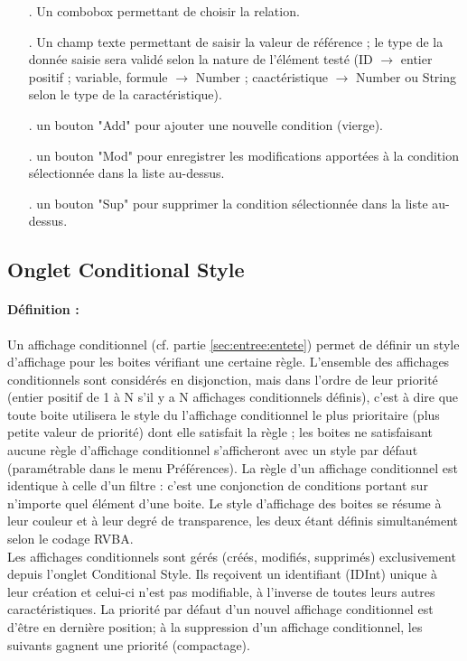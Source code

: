 \documentclass[a4paper]{article}
\begin{document}
\begin{itemize}
\begin{itemize}
  \item[.] Un combobox permettant de choisir la relation.
  \item[.] Un champ texte permettant de saisir la valeur de référence ; le type de la donnée saisie sera validé selon la nature de l'élément testé (ID $\to$ entier positif ; variable, formule $\to$ Number ; caactéristique $\to$ Number ou String selon le type de la caractéristique).
  \item[.] un bouton "Add" pour ajouter une nouvelle condition (vierge).\danger
  \item[.] un bouton "Mod" pour enregistrer les modifications apportées à la condition sélectionnée dans la liste au-dessus.\danger
  \item[.] un bouton "Sup" pour supprimer la condition sélectionnée dans la liste au-dessus.\danger
  \end{itemize}
\end{itemize}


\subsection{Onglet Conditional Style}\label{sec:onglet:aff}

\paragraph{Définition :} Un affichage conditionnel (cf. partie \ref{sec:entree:entete}) permet de définir un style d'affichage pour les boites vérifiant une certaine règle. L'ensemble des affichages conditionnels sont considérés en disjonction, mais dans l'ordre de leur priorité (entier positif de 1 à N s'il y a N affichages conditionnels définis), c'est à dire que toute boite utilisera le style du l'affichage conditionnel le plus prioritaire (plus petite valeur de priorité) dont elle satisfait la règle ; les boites ne satisfaisant aucune règle d'affichage conditionnel s'afficheront avec un style par défaut (paramétrable dans le menu Préférences). La règle d'un affichage conditionnel est identique à celle d'un filtre : c'est une conjonction de conditions portant sur n'importe quel élément d'une boite. Le style d'affichage des boites se résume à leur couleur et à leur degré de transparence, les deux étant définis simultanément selon le codage RVBA.\\Les affichages conditionnels sont gérés (créés, modifiés, supprimés) exclusivement depuis l'onglet Conditional Style. Ils reçoivent un identifiant (IDInt) unique à leur création et celui-ci n'est pas modifiable, à l'inverse de toutes leurs autres caractéristiques. La priorité par défaut d'un nouvel affichage conditionnel est d'être en dernière position; à la suppression d'un affichage conditionnel, les suivants gagnent une priorité (compactage).
\end{document}
